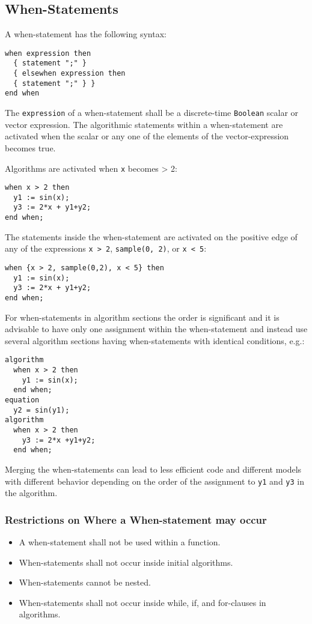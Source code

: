\subsection{When-Statements}\label{when-statements}

A when-statement has the following syntax:
\begin{lstlisting}[language=grammar]
when expression then
  { statement ";" }
  { elsewhen expression then
  { statement ";" } }
end when
\end{lstlisting}
The \lstinline!expression! of a when-statement shall be a discrete-time \lstinline!Boolean! scalar or vector expression.  The algorithmic statements within a when-statement are activated when the scalar or any one of the elements of the vector-expression becomes true.

\begin{example}
Algorithms are activated when \lstinline!x! becomes \textgreater{} 2:
\begin{lstlisting}[language=modelica]
when x > 2 then
  y1 := sin(x);
  y3 := 2*x + y1+y2;
end when;
\end{lstlisting}
The statements inside the when-statement are activated on the positive edge of any of the expressions
\lstinline!x > 2!, \lstinline!sample(0, 2)!, or \lstinline!x < 5!:
\begin{lstlisting}[language=modelica]
when {x > 2, sample(0,2), x < 5} then
  y1 := sin(x);
  y3 := 2*x + y1+y2;
end when;
\end{lstlisting}
For when-statements in algorithm sections the order is significant
and it is advisable to have only one assignment within the
when-statement and instead use several algorithm sections having
when-statements with identical conditions, e.g.:
\begin{lstlisting}[language=modelica]
algorithm
  when x > 2 then
    y1 := sin(x);
  end when;
equation
  y2 = sin(y1);
algorithm
  when x > 2 then
    y3 := 2*x +y1+y2;
  end when;
\end{lstlisting}
Merging the when-statements can lead to less efficient code and
different models with different behavior depending on the order of the
assignment to \lstinline!y1! and \lstinline!y3! in the algorithm.
\end{example}

\subsubsection{Restrictions on Where a When-statement may occur}\label{restrictions-on-where-a-when-statement-may-occur}
\begin{itemize}
\item
  A when-statement shall not be used within a function.
\item
  When-statements shall not occur inside initial algorithms.
\item
  When-statements cannot be nested.
\item
  When-statements shall not occur inside while, if, and for-clauses in
  algorithms.
\end{itemize}


